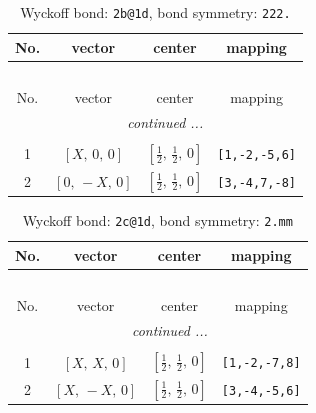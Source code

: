\documentclass[fleqn,8pt]{jsarticle}
\begin{document}
\renewcommand{\arraystretch}{1.2}
\begin{longtable}{cccc}
\caption{Wyckoff bond: {\tt 2b@1d}, bond symmetry: {\tt 222.}}
 \\
 \hline \hline
No. & vector & center & mapping \\ \hline \endfirsthead

\multicolumn{3}{l}{\tablename\ \thetable{}} \\
 \hline \hline
No. & vector & center & mapping \\ \hline \endhead

 \hline \hline
\multicolumn{3}{r}{\footnotesize\it continued ...} \\ \endfoot

 \hline \hline
\multicolumn{3}{r}{} \\ \endlastfoot

1 & $\left[ X,\, 0,\, 0 \right]$ & $\left[ \frac{1}{2},\, \frac{1}{2},\, 0 \right]$ & {\tt [1,-2,-5,6]} \\ \hline
2 & $\left[ 0,\, - X,\, 0 \right]$ & $\left[ \frac{1}{2},\, \frac{1}{2},\, 0 \right]$ & {\tt [3,-4,7,-8]} \\
\end{longtable}
\renewcommand{\arraystretch}{1.2}
\begin{longtable}{cccc}
\caption{Wyckoff bond: {\tt 2c@1d}, bond symmetry: {\tt 2.mm}}
 \\
 \hline \hline
No. & vector & center & mapping \\ \hline \endfirsthead

\multicolumn{3}{l}{\tablename\ \thetable{}} \\
 \hline \hline
No. & vector & center & mapping \\ \hline \endhead

 \hline \hline
\multicolumn{3}{r}{\footnotesize\it continued ...} \\ \endfoot

 \hline \hline
\multicolumn{3}{r}{} \\ \endlastfoot

1 & $\left[ X,\, X,\, 0 \right]$ & $\left[ \frac{1}{2},\, \frac{1}{2},\, 0 \right]$ & {\tt [1,-2,-7,8]} \\ \hline
2 & $\left[ X,\, - X,\, 0 \right]$ & $\left[ \frac{1}{2},\, \frac{1}{2},\, 0 \right]$ & {\tt [3,-4,-5,6]} \\
\end{longtable}
\renewcommand{\arraystretch}{1.2}
\end{document}
